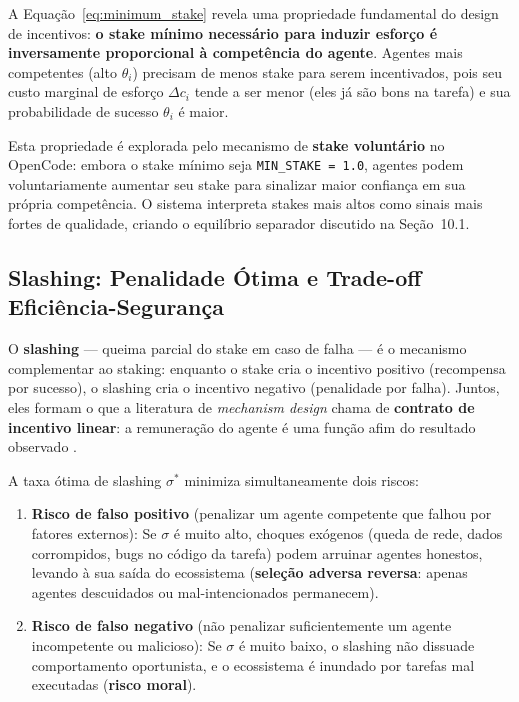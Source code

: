 A Equação~\eqref{eq:minimum_stake} revela uma propriedade fundamental do design de incentivos: \textbf{o stake mínimo necessário para induzir esforço é inversamente proporcional à competência do agente}. Agentes mais competentes (alto $\theta_i$) precisam de menos stake para serem incentivados, pois seu custo marginal de esforço $\Delta c_i$ tende a ser menor (eles já são bons na tarefa) e sua probabilidade de sucesso $\theta_i$ é maior.

Esta propriedade é explorada pelo mecanismo de \textbf{stake voluntário} no OpenCode: embora o stake mínimo seja \texttt{MIN\_STAKE = 1.0}, agentes podem voluntariamente aumentar seu stake para sinalizar maior confiança em sua própria competência. O sistema interpreta stakes mais altos como sinais mais fortes de qualidade, criando o equilíbrio separador discutido na Seção~10.1.

\subsection{Slashing: Penalidade Ótima e Trade-off Eficiência-Segurança}

O \textbf{slashing} --- queima parcial do stake em caso de falha --- é o mecanismo complementar ao staking: enquanto o stake cria o incentivo positivo (recompensa por sucesso), o slashing cria o incentivo negativo (penalidade por falha). Juntos, eles formam o que a literatura de \textit{mechanism design} chama de \textbf{contrato de incentivo linear}: a remuneração do agente é uma função afim do resultado observado \cite{laffont2002theory}.

A taxa ótima de slashing $\sigma^*$ minimiza simultaneamente dois riscos:

\begin{enumerate}
    \item \textbf{Risco de falso positivo} (penalizar um agente competente que falhou por fatores externos): Se $\sigma$ é muito alto, choques exógenos (queda de rede, dados corrompidos, bugs no código da tarefa) podem arruinar agentes honestos, levando à sua saída do ecossistema (\textbf{seleção adversa reversa}: apenas agentes descuidados ou mal-intencionados permanecem).
    
    \item \textbf{Risco de falso negativo} (não penalizar suficientemente um agente incompetente ou malicioso): Se $\sigma$ é muito baixo, o slashing não dissuade comportamento oportunista, e o ecossistema é inundado por tarefas mal executadas (\textbf{risco moral}).
\end{enumerate}

